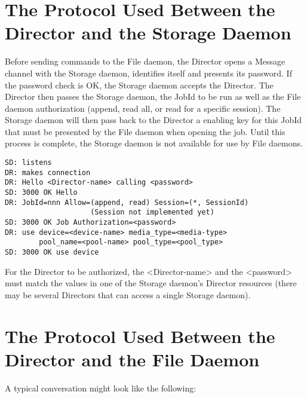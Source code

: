 \section{The Protocol Used Between the Director and the Storage Daemon}

Before sending commands to the File daemon, the Director opens a Message
channel with the Storage daemon, identifies itself and presents its password.
If the password check is OK, the Storage daemon accepts the Director. The
Director then passes the Storage daemon, the JobId to be run as well as the
File daemon authorization (append, read all, or read for a specific session).
The Storage daemon will then pass back to the Director a enabling key for this
JobId that must be presented by the File daemon when opening the job. Until
this process is complete, the Storage daemon is not available for use by File
daemons.

\footnotesize
\begin{verbatim}
SD: listens
DR: makes connection
DR: Hello <Director-name> calling <password>
SD: 3000 OK Hello
DR: JobId=nnn Allow=(append, read) Session=(*, SessionId)
                    (Session not implemented yet)
SD: 3000 OK Job Authorization=<password>
DR: use device=<device-name> media_type=<media-type>
        pool_name=<pool-name> pool_type=<pool_type>
SD: 3000 OK use device
\end{verbatim}
\normalsize

For the Director to be authorized, the {\textless}Director-name{\textgreater} and the
{\textless}password{\textgreater} must match the values in one of the Storage daemon's
Director resources (there may be several Directors that can access a single
Storage daemon).

\section{The Protocol Used Between the Director and the File Daemon}

A typical conversation might look like the following:

